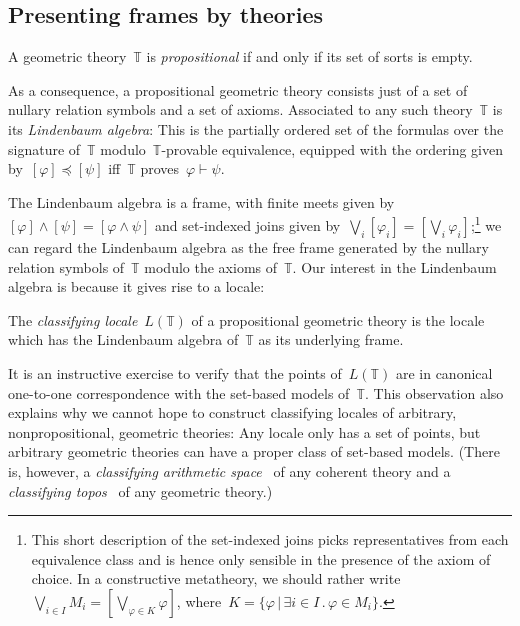 \documentclass{ws-rv9x6}
\newcommand{\TT}{\mathbb{T}}
\renewcommand{\_}{\mathpunct{.}}
\newcommand{\?}{\,{:}\,}
\begin{document}
\subsection{Presenting frames by theories}
\label{sect:presenting-frames}

\begin{definition}A geometric theory~$\TT$ is \emph{propositional} if and only
if its set of sorts is empty.\end{definition}

As a consequence, a propositional geometric theory consists just of a set of
nullary relation symbols and a set of axioms. Associated to any such
theory~$\TT$ is its \emph{Lindenbaum algebra}: This is the partially ordered
set of the formulas over the signature of~$\TT$ modulo~$\TT$-provable
equivalence, equipped with the ordering given by~$[\varphi] \preceq [\psi]$ iff~$\TT$
proves~$\varphi \vdash \psi$.

The Lindenbaum algebra is a frame, with finite meets given by~$[\varphi] \wedge
[\psi] = [\varphi \wedge \psi]$ and set-indexed joins given by~$\bigvee_i
[\varphi_i] = [\bigvee_i \varphi_i]$;\footnote{This short description of the
set-indexed joins picks representatives from each equivalence class and is
hence only sensible in the presence of the axiom of choice. In a
constructive metatheory, we should rather write~$\bigvee_{i \in I} M_i =
[\bigvee_{\varphi \in K} \varphi]$, where~$K = \{ \varphi \,|\, \exists i \in
I\_ \varphi \in M_i \}$.} we can regard the Lindenbaum algebra as the free
frame generated by the nullary relation symbols of~$\TT$ modulo the axioms
of~$\TT$. Our interest in the Lindenbaum algebra is because it gives rise to a
locale:

\begin{definition}The \emph{classifying locale}~$L(\TT)$ of a propositional
geometric theory is the locale which has the Lindenbaum algebra of~$\TT$ as its
underlying frame.\end{definition}

It is an instructive exercise to verify that the points of~$L(\TT)$ are in
canonical one-to-one correspondence with the set-based models of~$\TT$. This
observation also explains why we cannot hope to construct classifying
locales of arbitrary, nonpropositional, geometric theories: Any locale only has
a set of points, but arbitrary geometric theories can have a proper class of
set-based models. (There is, however, a \emph{classifying arithmetic
space}~\cite{vickers:sketches} of any coherent theory and a \emph{classifying
topos}~\cite[Section~2]{caramello:tst} of any geometric theory.)
\end{document}
